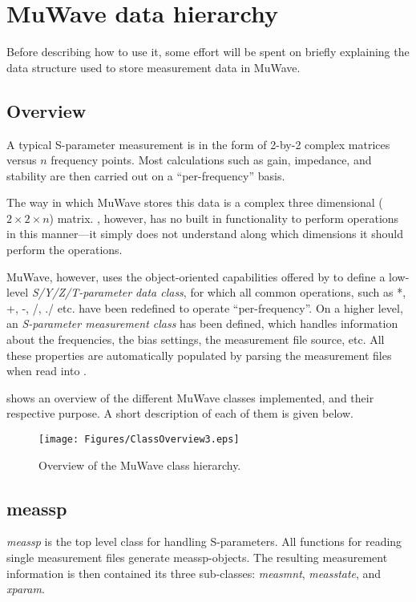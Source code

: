 %

\section{MuWave data hierarchy} %
Before describing how to use it, some effort will be spent on
briefly explaining the data structure used to store measurement
data in MuWave.

\subsection{Overview}
A typical S-parameter measurement is in the form of 2-by-2 complex
matrices versus $n$ frequency points. Most calculations such as
gain, impedance, and stability are then carried out on a
``per-frequency'' basis.

The way in which MuWave stores this data is a complex three
dimensional ($2 \times 2\times n$) matrix. \matlab, however, has
no built in functionality to perform operations in this
manner---it simply does not understand along which dimensions it
should perform the operations.

MuWave, however, uses the object-oriented capabilities offered by
\matlab to define a low-level \emph{S/Y/Z/T-parameter data class},
for which all common \matlab operations, such as *, +, -, /, ./
etc. have been redefined to operate ``per-frequency''. On a higher
level, an \emph{S-parameter measurement class} has been defined,
which handles information about the frequencies, the bias
settings, the measurement file source, etc. All these properties
are automatically populated by parsing the measurement files when
read into \matlab.

 shows an overview of the different MuWave
classes implemented, and their respective purpose. A short
description of each of them is given below.

\begin{figure}[htbf]
  \texttt{[image: Figures/ClassOverview3.eps]}
  \caption{Overview of the MuWave class hierarchy.}\label{fig:ClassHierarchy}
\end{figure}

\subsection{meassp}
\emph{meassp} is the top level class for handling S-parameters.
All functions for reading single measurement files generate
meassp-objects. The resulting measurement information is then
contained its three sub-classes: \emph{measmnt}, \emph{measstate},
and \emph{xparam}.

